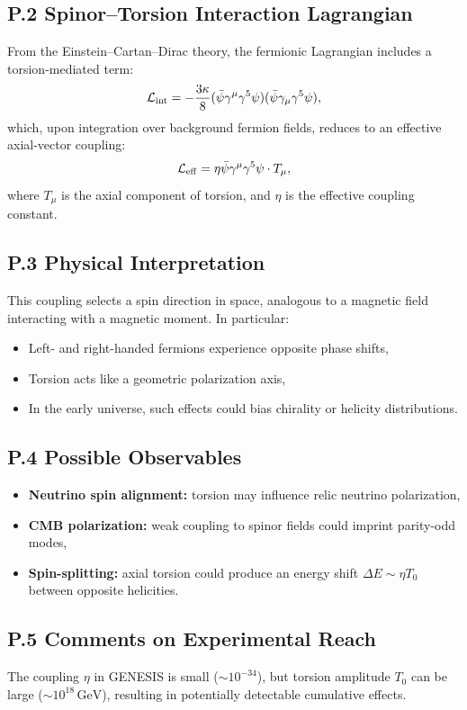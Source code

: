 \documentclass{article}
\begin{document}
\subsection*{P.2 Spinor–Torsion Interaction Lagrangian}
From the Einstein–Cartan–Dirac theory, the fermionic Lagrangian includes a torsion-mediated term:
\begin{equation}
\mathcal{L}_{\rm int} = -\frac{3\kappa}{8} (\bar{\psi} \gamma^\mu \gamma^5 \psi)(\bar{\psi} \gamma_\mu \gamma^5 \psi),
\end{equation}
which, upon integration over background fermion fields, reduces to an effective axial-vector coupling:
\begin{equation}
\mathcal{L}_{\rm eff} = \eta \bar{\psi} \gamma^\mu \gamma^5 \psi \cdot T_\mu,
\end{equation}
where \(T_\mu\) is the axial component of torsion, and \(\eta\) is the effective coupling constant.

\subsection*{P.3 Physical Interpretation}
This coupling selects a spin direction in space, analogous to a magnetic field interacting with a magnetic moment. In particular:
\begin{itemize}
  \item Left- and right-handed fermions experience opposite phase shifts,
  \item Torsion acts like a geometric polarization axis,
  \item In the early universe, such effects could bias chirality or helicity distributions.
\end{itemize}

\subsection*{P.4 Possible Observables}
\begin{itemize}
  \item \textbf{Neutrino spin alignment:} torsion may influence relic neutrino polarization,
  \item \textbf{CMB polarization:} weak coupling to spinor fields could imprint parity-odd modes,
  \item \textbf{Spin-splitting:} axial torsion could produce an energy shift \(\Delta E \sim \eta T_0\) between opposite helicities.
\end{itemize}

\subsection*{P.5 Comments on Experimental Reach}
The coupling \(\eta\) in GENESIS is small (\(\sim 10^{-34}\)), but torsion amplitude \(T_0\) can be large (\(\sim 10^{18}\,\mathrm{GeV}\)), resulting in potentially detectable cumulative effects.
\end{document}
